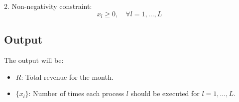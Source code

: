\documentclass{article}
\begin{document}
2. Non-negativity constraint:
\[
x_l \geq 0, \quad \forall l = 1, \ldots, L
\]

\subsection*{Output}
The output will be:
\begin{itemize}
    \item \( R \): Total revenue for the month.
    \item \( \{x_l\} \): Number of times each process \( l \) should be executed for \( l = 1, \ldots, L \).
\end{itemize}
\end{document}

